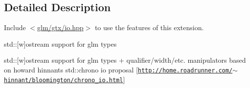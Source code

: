 \subsection{Detailed Description}
Include $<$\hyperlink{io_8hpp}{glm/gtx/io.\+hpp}$>$ to use the features of this extension.

std\+:\+:\mbox{[}w\mbox{]}ostream support for glm types

std\+:\+:\mbox{[}w\mbox{]}ostream support for glm types + qualifier/width/etc. manipulators based on howard hinnant\textquotesingle{}s std\+::chrono io proposal \mbox{[}\href{http://home.roadrunner.com/~hinnant/bloomington/chrono_io.html}{\tt http\+://home.\+roadrunner.\+com/$\sim$hinnant/bloomington/chrono\+\_\+io.\+html}\mbox{]} 